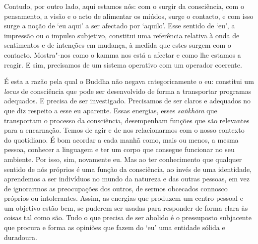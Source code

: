 Contudo, por outro lado, aqui estamos nós: com o surgir da consciência, com o
pensamento, a visão e o acto de alimentar os miúdos, surge o contacto, e com
isso surge a noção de `eu aqui' a ser afectado por `aquilo'. Esse sentido de
`eu', a impressão ou o impulso subjetivo, constitui uma referência relativa à
onda de sentimentos e de intenções em mudança, à medida que estes surgem com o
contacto. Mostra"-nos como o kamma nos está a afectar e como lhe estamos a
reagir. E sim, precisamos de um sistema operativo com um operador coerente. 

É
esta a razão pela qual o Buddha não negava categoricamente o eu: constitui um
\emph{locus} de consciência que pode ser desenvolvido de forma a transportar
programas adequados. E precisa de ser investigado. Precisamos de ser claros e
adequados no que diz respeito a esse eu aparente. Essas energias, esses
\emph{saṅkhāra} que transportam o processo da consciência, desempenham funções
que são relevantes para a encarnação. Temos de agir e de nos relacionarmos com o
nosso contexto do quotidiano. É bom acordar a cada manhã como, mais ou menos, a
mesma pessoa, conhecer a linguagem e ter um corpo que consegue funcionar no seu
ambiente. Por isso, sim, novamente eu. Mas ao ter conhecimento que qualquer
sentido de nós próprios é uma função da consciência, ao invés de uma identidade,
aprendemos a ser indivíduos no mundo da natureza e das outras pessoas, em vez de
ignorarmos as preocupações dos outros, de sermos obcecados connosco próprios ou
intolerantes. Assim, as energias que produzem um centro pessoal e um objetivo
estão bem, se puderem ser usadas para responder de forma clara às coisas tal
como são. Tudo o que precisa de ser abolido é o pressuposto subjacente que
procura e forma as opiniões que fazem do `eu' uma entidade sólida e duradoura.

